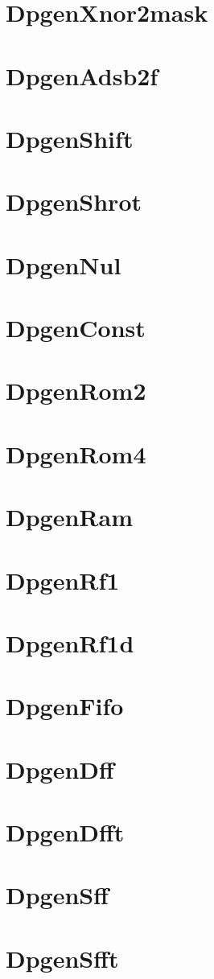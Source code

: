 \documentclass[12pt]{article}
\begin{document}
\section{DpgenXnor2mask} 

\section{DpgenAdsb2f} 

\section{DpgenShift} 

\section{DpgenShrot} 

\section{DpgenNul}

\section{DpgenConst}

\section{DpgenRom2}

\section{DpgenRom4}

\section{DpgenRam}

\section{DpgenRf1}

\section{DpgenRf1d}

\section{DpgenFifo}

\section{DpgenDff}

\section{DpgenDfft}

\section{DpgenSff}

\section{DpgenSfft}

\end{document}
